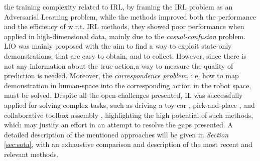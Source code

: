 the training complexity related to IRL, by framing the IRL problem as an Adversarial Learning problem, while the methods
improved both the performance and the efficiency of w.r.t. IRL methods, they showed poor performance when applied in
high-dimensional data, mainly due to the \textit{casual-confusion} problem. LfO was mainly proposed with
the aim to find a way to exploit state-only demonstrations, that are easy to obtain, and to collect. However, since
there is not any information about the true action,a way to measure the quality of prediction is needed. Moreover, the
\textit{correspondence problem}, i.e. how to map demonstration in human-space into the corresponding action in the robot
space, must be solved.     
\newline Despite all the open-challenges presented, IL was successfully applied for solving complex tasks, such as
driving a toy car \cite{codevilla2018end_to_end}, pick-and-place \cite{zhang2018deep_vr_teleoperation}, and collaborative toolbox
assembly \cite{maeda2017probabilistic}, highlighting the high potential of such methods, which may justify an effort in
an attempt to resolve the gaps presented. A detailed description of the mentioned approaches will be given in
\textit{Section} \ref{sec:sota}, with an exhaustive comparison and description of the most recent and relevant methods.


